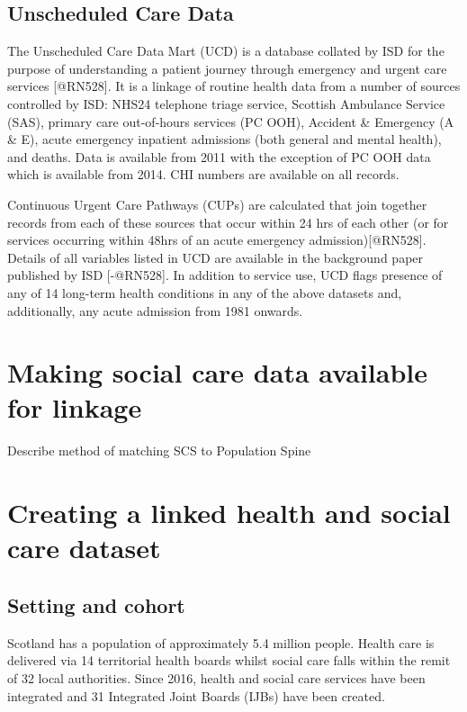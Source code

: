 \documentclass[]{article}
\begin{document}
\subsection{Unscheduled Care Data}\label{subsec:source-ucd}

The Unscheduled Care Data Mart (UCD) is a database collated by ISD for
the purpose of understanding a patient journey through emergency and
urgent care services {[}@RN528{]}. It is a linkage of routine health
data from a number of sources controlled by ISD: NHS24 telephone triage
service, Scottish Ambulance Service (SAS), primary care out-of-hours
services (PC OOH), Accident \& Emergency (A \& E), acute emergency
inpatient admissions (both general and mental health), and deaths. Data
is available from 2011 with the exception of PC OOH data which is
available from 2014. CHI numbers are available on all records.

Continuous Urgent Care Pathways (CUPs) are calculated that join together
records from each of these sources that occur within 24 hrs of each
other (or for services occurring within 48hrs of an acute emergency
admission){[}@RN528{]}. Details of all variables listed in UCD are
available in the background paper published by ISD {[}-@RN528{]}. In
addition to service use, UCD flags presence of any of 14 long-term
health conditions in any of the above datasets and, additionally, any
acute admission from 1981 onwards.

\section{Making social care data available for linkage}\label{sec:linkage}

Describe method of matching SCS to Population Spine

\section{Creating a linked health and social care dataset}\label{sec:make-dataset}

\FloatBarrier

\subsection{Setting and cohort}\label{subsec:setting-cohort}

Scotland has a population of approximately 5.4 million people. Health
care is delivered via 14 territorial health boards whilst social care
falls within the remit of 32 local authorities. Since 2016, health and
social care services have been integrated and 31 Integrated Joint Boards
(IJBs) have been created.
\end{document}
